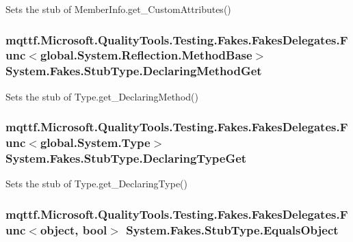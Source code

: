 Sets the stub of Member\-Info.\-get\-\_\-\-Custom\-Attributes()

\hypertarget{class_system_1_1_fakes_1_1_stub_type_abd934a1b5fbf98b488c4af391a3ba95e}{
\subsubsection[{Declaring\-Method\-Get}]{\setlength{\rightskip}{0pt plus 5cm}mqttf.\-Microsoft.\-Quality\-Tools.\-Testing.\-Fakes.\-Fakes\-Delegates.\-Func$<$global.\-System.\-Reflection.\-Method\-Base$>$ System.\-Fakes.\-Stub\-Type.\-Declaring\-Method\-Get}}\label{class_system_1_1_fakes_1_1_stub_type_abd934a1b5fbf98b488c4af391a3ba95e}


Sets the stub of Type.\-get\-\_\-\-Declaring\-Method()

\hypertarget{class_system_1_1_fakes_1_1_stub_type_a177032c22a68251e22b44329ce78c059}{
\subsubsection[{Declaring\-Type\-Get}]{\setlength{\rightskip}{0pt plus 5cm}mqttf.\-Microsoft.\-Quality\-Tools.\-Testing.\-Fakes.\-Fakes\-Delegates.\-Func$<$global.\-System.\-Type$>$ System.\-Fakes.\-Stub\-Type.\-Declaring\-Type\-Get}}\label{class_system_1_1_fakes_1_1_stub_type_a177032c22a68251e22b44329ce78c059}


Sets the stub of Type.\-get\-\_\-\-Declaring\-Type()

\hypertarget{class_system_1_1_fakes_1_1_stub_type_a905b00a3bf43c47ab9103ee144343071}{
\subsubsection[{Equals\-Object}]{\setlength{\rightskip}{0pt plus 5cm}mqttf.\-Microsoft.\-Quality\-Tools.\-Testing.\-Fakes.\-Fakes\-Delegates.\-Func$<$object, bool$>$ System.\-Fakes.\-Stub\-Type.\-Equals\-Object}}\label{class_system_1_1_fakes_1_1_stub_type_a905b00a3bf43c47ab9103ee144343071}



